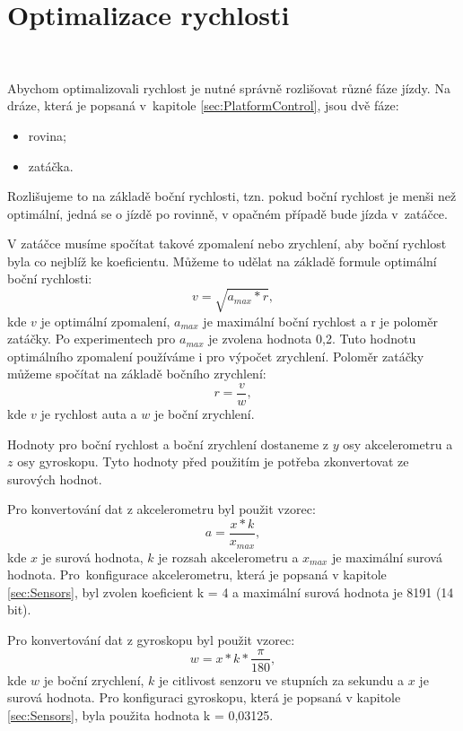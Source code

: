 \chapter{Optimalizace rychlosti}
\label{sec:SpeedOptimization}
\

Abychom optimalizovali rychlost je nutné správně rozlišovat různé fáze jízdy. Na
dráze, která je popsaná v~kapitole \ref{sec:PlatformControl}, jsou dvě fáze:
\begin{itemize}
	\item{rovina;}
	\item{zatáčka.}
\end{itemize}

Rozlišujeme to na základě boční rychlosti, tzn. pokud boční rychlost je menši než
optimální, jedná se o jízdě po rovinně, v opačném případě bude jízda v~zatáčce.

V zatáčce musíme spočítat takové zpomalení nebo zrychlení, aby boční rychlost byla
co nejblíž ke koeficientu. Můžeme to udělat na základě formule optimální boční
rychlosti:
\begin{equation}
v = \sqrt{a_{max} * r},
\end{equation}
kde $v$ je optimální zpomalení, $a_{max}$ je maximální boční rychlost a r je poloměr
zatáčky. Po experimentech pro $a_{max}$ je zvolena hodnota 0,2. Tuto hodnotu
optimálního zpomalení používáme i pro výpočet zrychlení. Poloměr zatáčky můžeme
spočítat na základě bočního zrychlení:
\begin{equation}
r = \frac{v}{w},
\end{equation}
kde $v$ je rychlost auta a $w$ je boční zrychlení.

Hodnoty pro boční rychlost a boční zrychlení dostaneme z $y$ osy akcelerometru a $z$
osy gyroskopu. Tyto hodnoty před použitím je potřeba zkonvertovat ze surových
hodnot.

Pro konvertování dat z akcelerometru byl použit vzorec:
\begin{equation}
a = \frac{x * k}{x_{max}},
\end{equation}
kde $x$ je surová hodnota, $k$ je rozsah akcelerometru a $x_{max}$ je maximální
surová hodnota. Pro~konfigurace akcelerometru, která je popsaná v kapitole
\ref{sec:Sensors}, byl zvolen koeficient k = 4 a maximální surová hodnota je 8191
(14 bit).

Pro konvertování dat z gyroskopu byl použit vzorec:
\begin{equation}
w = x * k * \frac{\pi}{180},
\end{equation}
kde $w$ je boční zrychlení, $k$ je citlivost senzoru ve stupních za sekundu a $x$ je
surová hodnota. Pro konfiguraci gyroskopu, která je popsaná v kapitole
\ref{sec:Sensors}, byla použita hodnota k = 0,03125.

\endinput

